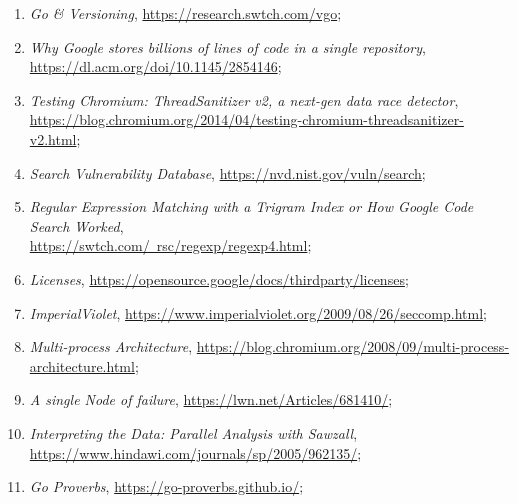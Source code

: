 \documentclass[a4paper,11pt]{article}
\begin{document}
\begin{enumerate}
\item \textit{Go \& Versioning},
  \href{https://research.swtch.com/vgo}{https://research.swtch.com/vgo};

\item \textit{Why Google stores billions of lines of code in a single
    repository},
  \href{https://dl.acm.org/doi/10.1145/2854146}{https://dl.acm.org/doi/10.1145/2854146};

\item \textit{Testing Chromium: ThreadSanitizer v2, a next-gen data
    race
    detector}, \\
  \href{https://blog.chromium.org/2014/04/testing-chromium-threadsanitizer-v2.html}{https://blog.chromium.org/2014/04/testing-chromium-threadsanitizer-v2.html};

\item \textit{Search Vulnerability Database},
  \href{https://nvd.nist.gov/vuln/search}{https://nvd.nist.gov/vuln/search};

\item \textit{Regular Expression Matching with a Trigram Index or How
    Google Code Search Worked}, \\
  \href{https://swtch.com/~rsc/regexp/regexp4.html}{https://swtch.com/~rsc/regexp/regexp4.html};

\item \textit{Licenses},
  \href{https://opensource.google/docs/thirdparty/licenses}{https://opensource.google/docs/thirdparty/licenses};

\item \textit{ImperialViolet},
  \href{https://www.imperialviolet.org/2009/08/26/seccomp.html}{https://www.imperialviolet.org/2009/08/26/seccomp.html};

\item \textit{Multi-process Architecture},
  \href{https://blog.chromium.org/2008/09/multi-process-architecture.html}{https://blog.chromium.org/2008/09/multi-process-architecture.html};

\item \textit{A single Node of failure},
  \href{https://lwn.net/Articles/681410/}{https://lwn.net/Articles/681410/};

\item \textit{Interpreting the Data: Parallel Analysis with Sawzall},
  \href{https://www.hindawi.com/journals/sp/2005/962135/}{https://www.hindawi.com/journals/sp/2005/962135/};

\item \textit{Go Proverbs},
  \href{https://go-proverbs.github.io/}{https://go-proverbs.github.io/};


\end{enumerate}
\end{document}
